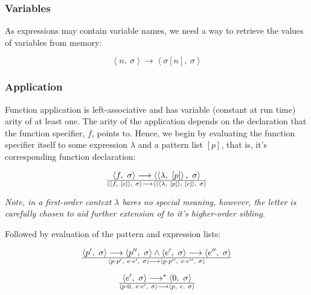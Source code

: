 \subsubsection{Variables}

As expressions may contain variable names, we need a way to retrieve the values
of variables from memory:

\begin{equation}
\left\langle n,\ \sigma\right\rangle
\longrightarrow
\left\langle \sigma[n],\ \sigma\right\rangle
\end{equation}

\subsubsection{Application}

Function application is left-associative and has variable (constant at run
time) arity of at least one. The arity of the application depends on the
declaration that the function specifier, $f$, points to. Hence, we begin by
evaluating the function specifier itself to some expression $\lambda$ and a
pattern list $[p]$, that is, it's corresponding function declaration:

\begin{equation}
{
\left\langle f,\ \sigma\right\rangle
\longrightarrow
\left\langle \left\langle \lambda,\ [p]\right\rangle,\ \sigma\right\rangle
}\over{
\left\langle \left\langle f,\ [e]\right\rangle,\ \sigma\right\rangle
\longrightarrow
\left\langle
\left\langle\left\langle \lambda,\ [p]\right\rangle,\ [e]\right\rangle
,\ \sigma\right\rangle
}
\end{equation}

\emph{Note, in a first-order context $\lambda$ bares no special meaning,
however, the letter is carefully chosen to aid further extension of  to
it's higher-order sibling.}

Followed by evaluation of the pattern and expression lists:

\begin{equation}
{
\left\langle p',\ \sigma\right\rangle
\longrightarrow
\left\langle p'',\ \sigma\right\rangle
\wedge
\left\langle e',\ \sigma\right\rangle
\longrightarrow
\left\langle e'',\ \sigma\right\rangle
}\over{
\left\langle p\cdot p',\ e\cdot e',\ \sigma\right\rangle
\longrightarrow
\left\langle p\cdot p'',\ e\cdot e'',\ \sigma\right\rangle
}
\end{equation}

\begin{equation}
{
\left\langle e',\ \sigma\right\rangle
\longrightarrow^*
\left\langle 0,\ \sigma\right\rangle
}\over{
\left\langle p\cdot 0,\ e\cdot e',\ \sigma\right\rangle
\longrightarrow
\left\langle p,\ e,\ \sigma\right\rangle
}
\end{equation}


